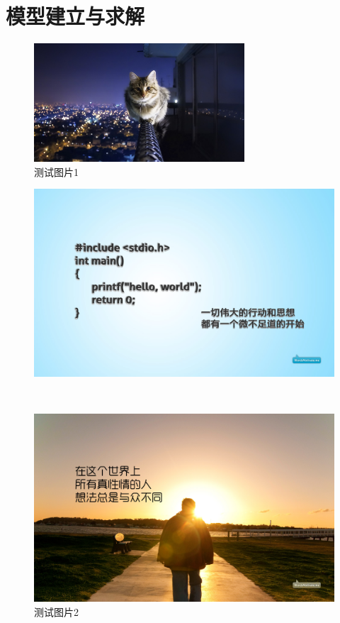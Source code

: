 \documentclass[12pt]{article}%
\begin{document}
\section{模型建立与求解}

\begin{figure}[!h]
\centering
\includegraphics[width=0.7\textwidth]{./Image/testFigure.jpg}
\caption{测试图片1}
\end{figure}

\begin{figure}[!h]
\centering
\begin{minipage}[t]{0.4\linewidth}
\includegraphics[width=\textwidth]{./Image/zuhe1.jpg}
\end{minipage}~~
\begin{minipage}[t]{0.4\linewidth}
\includegraphics[width=\textwidth]{./Image/zuhe2.jpg}
\end{minipage}
\caption{测试图片2}
\end{figure}
\end{document}
